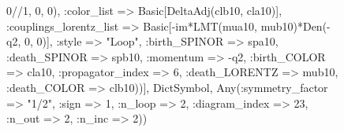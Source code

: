 \documentclass{revtex4}
\begin{document}
\begin{figure}[!htb]
\begin{center}
{0//1, 0, 0), :color_list => Basic[DeltaAdj(clb10, cla10)], :couplings_lorentz_list => Basic[-im*LMT(mua10, mub10)*Den(-q2, 0, 0)], :style => "Loop", :birth_SPINOR => spa10, :death_SPINOR => spb10, :momentum => -q2, :birth_COLOR => cla10, :propagator_index => 6, :death_LORENTZ => mub10, :death_COLOR => clb10))], Dict{Symbol, Any}(:symmetry_factor => "1/2", :sign => 1, :n_loop => 2, :diagram_index => 23, :n_out => 2, :n_inc => 2)) 
}
\end{center}
\end{figure}
\end{document}
